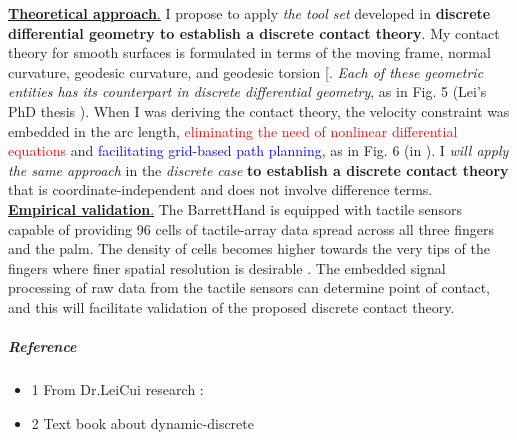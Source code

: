 \uline{\textbf{Theoretical approach}.} I propose to apply \emph{the tool set} developed in \textbf{discrete differential geometry to establish a discrete contact theory}. My contact theory for smooth surfaces is formulated in terms of the moving frame, normal curvature, geodesic curvature, and geodesic torsion [\cite{Lei09_coordinate-free_instantaneous_kinematics, Lei10_Darboux-Frame, Lei15_PolynomialFormulation_InverseKinematics, Lei15_sliding.rolling.loci_kinematics, Lei10_PhDThesis}. \emph{Each of these geometric entities has its counterpart in discrete differential geometry}, as in Fig. 5 (Lei's PhD thesis \cite{Lei10_PhDThesis}). When I was deriving the contact theory, the velocity constraint was embedded in the arc length, \textcolor{red}{eliminating the need of nonlinear differential equations} and \textcolor{blue}{facilitating grid-based path planning}, as in Fig. 6 (in \cite{Lei09_coordinate-free_instantaneous_kinematics}). I \emph{will apply the same approach} in the \emph{discrete case} \textbf{to establish a discrete contact theory} that is coordinate-independent and does not involve difference terms.\\


\uline{\textbf{Empirical validation}.} The BarrettHand is equipped with tactile sensors capable of providing 96 cells of tactile-array data spread across all three fingers and the palm. The density of cells becomes higher towards the very tips of the fingers where finer spatial resolution is desirable \cite{Martin04_Quadrilateral_Discrete}. The embedded signal processing of raw data from the tactile sensors can determine point of contact, and this will facilitate validation of the proposed discrete contact theory.

\subparagraph{Reference}
\begin{itemize}
\item 1 From Dr.LeiCui research : \cite{Lei10_Darboux-Frame, Lei10_Geometric.Kinematics_PointContact, Lei11_Posture.Workspace_Multifinger, Lei12_Polynomial_Inverse.Kinematics, Lei12_ReciprocityBased_SVD_Inverse.Kinematics, Lei15_sliding.rolling.loci_kinematics, Lei15_PolynomialFormulation_InverseKinematics, Lei18_Rolling.Contact_Kinematics_Multifinger, Lei17_In-Hand_Forward.Inverse.Kinematics, Lei07_Euclidean_Invariants, Lei09_Kinematic.Geometry_Circular.Surfaces, Lei09_Orientation-Workspace_Metahand, Lei09_coordinate-free_instantaneous_kinematics}
\item 2 Text book about dynamic-discrete \cite{Book_Rosenberg77_DynamicsDiscrete}
\end{itemize}


